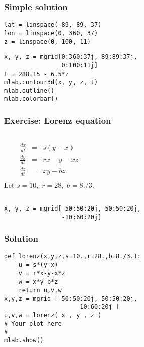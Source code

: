 \documentclass[compress,14pt]{beamer}
\newcounter{time}
\newcommand{\inctime}[1]{\addtocounter{time}{#1}{\vspace*{0.1in}\tiny \thetime\ m}}
\begin{document}
\begin{frame}[fragile]
    \frametitle{Simple solution}

    \begin{lstlisting}
lat = linspace(-89, 89, 37)
lon = linspace(0, 360, 37)
z = linspace(0, 100, 11)
    \end{lstlisting}
\pause
    \begin{lstlisting}
x, y, z = mgrid[0:360:37j,-89:89:37j,
                0:100:11j]
t = 288.15 - 6.5*z
mlab.contour3d(x, y, z, t)
mlab.outline()
mlab.colorbar()
    \end{lstlisting}
\end{frame}

\begin{frame}[fragile]
    \frametitle{Exercise: Lorenz equation}
    \begin{columns}
        \begin{eqnarray*}
        \frac{d x}{dt} &=& s (y-x)\\
        \frac{d y}{d t} &=& rx -y -xz\\
        \frac{d z}{d t} &=& xy - bz\\
        \end{eqnarray*}
        Let $s=10,$
        $r=28,$ 
        $b=8./3.$
    \end{columns}
  \begin{lstlisting}
x, y, z = mgrid[-50:50:20j,-50:50:20j,
                -10:60:20j]
  \end{lstlisting}
\inctime{20}

\end{frame}
\begin{frame}[fragile]
    \frametitle{Solution}
  \begin{lstlisting}
def lorenz(x,y,z,s=10.,r=28.,b=8./3.):
    u = s*(y-x)
    v = r*x-y-x*z
    w = x*y-b*z
    return u,v,w
x,y,z = mgrid [-50:50:20j,-50:50:20j,
                    -10:60:20j ]
u,v,w = lorenz( x , y , z )
# Your plot here
#
mlab.show()

  \end{lstlisting}
\end{frame}
  
\end{document}

